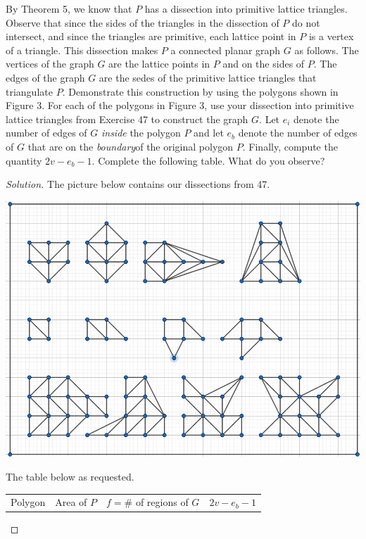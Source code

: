 \documentclass[12pt]{article}
\newenvironment{exercise}[2][Exercise]{\begin{trivlist}
        \item[\hskip \labelsep {\bfseries #1}\hskip \labelsep {\bfseries #2.}]}{\end{trivlist}}
\newenvironment{solution}
        {\begin{proof}[Solution]}
                    {\end{proof}}
\begin{document}
\begin{exercise}{57}
    By Theorem 5, we know that \( P \) has a dissection into primitive lattice triangles. Observe that since the sides of the triangles in the dissection of \( P \) do not intersect, and since the triangles are primitive, each lattice point in \( P \) is a vertex of a triangle. This dissection makes \( P \) a connected planar graph \( G \) as follows. The vertices of the graph \( G \) are the lattice points in \( P \) and on the sides of \( P. \) The edges of the graph \( G \) are the sedes of the primitive lattice triangles that triangulate \( P. \) Demonstrate this construction by using the polygons shown in Figure 3. For each of the polygons in Figure 3, use your dissection into primitive lattice triangles from Exercise 47 to construct the graph \( G. \) Let \( e_{i} \) denote the number of edges of \( G \) \textit{inside} the polygon \( P \) and let \( e_{b} \) denote the number of edges of \( G \) that are on the \textit{boundary}of the original polygon \( P. \) Finally, compute the quantity \( 2v-e_{b} -1. \) Complete the following table. What do you observe?
    \begin{solution}
        The picture below contains our dissections from 47.
        \begin{center}
            \includegraphics[scale=.4]{47}
        \end{center}
        The table below as requested.
        \begin{center}
            \begin{tabular}{| c | c | c | c |}
                \hline
                Polygon & Area of \( P \) & \( f = \# \) of regions of \( G \) & \( 2v-e_{b} -1 \) \\

\end{tabular}
\end{center}
\end{solution}
\end{exercise}
\end{document}

